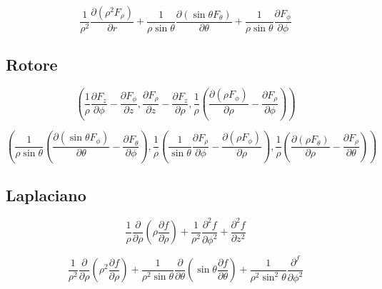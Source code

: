 \documentclass[a4paper, 11pt]{article}
\begin{document}
	$$\frac{1}{\rho^2}\frac{\partial \left(\rho^2 F_{\rho}\right)}{\partial r} + \frac{1}{\rho\sin\theta}\frac{\partial \left(\sin\theta F_{\theta}\right)}{\partial \theta} + \frac{1}{\rho\sin\theta}\frac{\partial F_{\phi}}{\partial \phi}$$


	\subsection{Rotore}
	$$\left( \frac{1}{\rho}\frac{\partial F_{z}}{\partial \phi}-\frac{\partial F_{\phi}}{\partial z} , \frac{\partial F_{\rho}}{\partial z}-\frac{\partial F_{z}}{\partial \rho} , \frac{1}{\rho}\left( \frac{\partial \left(\rho F_{\phi}\right)}{\partial \rho}-\frac{\partial F_{\rho}}{\partial \phi} \right)  \right) $$

	$$\left( \frac{1}{\rho\sin\theta}\left(\frac{\partial \left( \sin\theta F_{\phi}\right) }{\partial \theta}-\frac{\partial F_{\theta}}{\partial \phi}\right) , \frac{1}{\rho}\left( \frac{1}{\sin\theta}\frac{\partial F_{\rho}}{\partial \phi}-\frac{\partial \left( \rho F_{\phi} \right) }{\partial \rho} \right) , \frac{1}{\rho}\left( \frac{\partial \left( \rho F_{\theta} \right) }{\partial \rho}-\frac{\partial F_{\rho}}{\partial \theta} \right)  \right) $$

	\subsection{Laplaciano}
	$$\frac{1}{\rho}\frac{\partial }{\partial \rho}\left( \rho \frac{\partial f}{\partial \rho} \right) + \frac{1}{\rho^2}\frac{\partial ^2 f}{\partial \phi ^2} + \frac{\partial ^2 f}{\partial z^2}$$

	$$\frac{1}{\rho^2}\frac{\partial }{\partial \rho} \left( \rho^2 \frac{\partial f}{\partial \rho} \right) + \frac{1}{\rho^2 \sin\theta}\frac{\partial }{\partial \theta}\left( \sin\theta \frac{\partial f}{\partial \theta}\right) + \frac{1}{\rho ^2 \sin ^2 \theta}\frac{\partial ^ f}{\partial \phi ^2}$$
\end{document}
